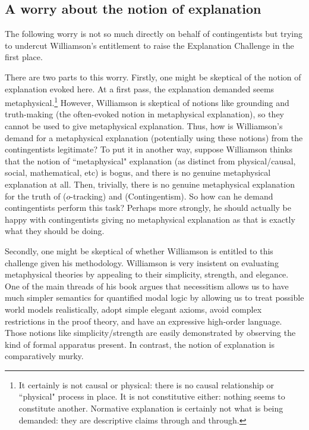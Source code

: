 \subsection{A worry about the notion of explanation}
The following worry is not so much directly on behalf of contingentists but trying to undercut Williamson's entitlement to raise the Explanation Challenge in the first place. 

There are two parts to this worry. 
Firstly, one might be skeptical of the notion of explanation evoked here. At a first pass, the explanation demanded seems metaphysical.\footnote{It certainly is not causal or physical: there is no causal relationship or ``physical" process in place. It is not constitutive either: nothing seems to constitute another. Normative explanation is certainly not what is being demanded: they are descriptive claims through and through.} However, Williamson is skeptical of notions like grounding and truth-making (the often-evoked notion in metaphysical explanation), so they cannot be used to give metaphysical explanation. Thus, how is Williamson's demand for a metaphysical explanation (potentially using these notions) from the contingentists legitimate? To put it in another way, suppose Williamson thinks that the notion of ``metaphysical" explanation (as distinct from physical/causal, social, mathematical, etc) is bogus, and there is no genuine metaphysical explanation at all. Then, trivially, there is no genuine metaphysical explanation for the truth of ($o$-tracking) and (Contingentism). So how can he demand contingentists perform this task? Perhaps more strongly, he should actually be happy with contingentists giving no metaphysical explanation as that is exactly what they should be doing. 

Secondly, one might be skeptical of whether Williamson is entitled to this challenge given his methodology. Williamson is very insistent on evaluating metaphysical theories by appealing to their simplicity, strength, and elegance. One of the main threads of his book argues that necessitism allows us to have much simpler semantics for quantified modal logic by allowing us to treat possible world models realistically, adopt simple elegant axioms, avoid complex restrictions in the proof theory, and have an expressive high-order language. Those notions like simplicity/strength are easily demonstrated by observing the kind of formal apparatus present. In contrast, the notion of explanation is comparatively murky.


